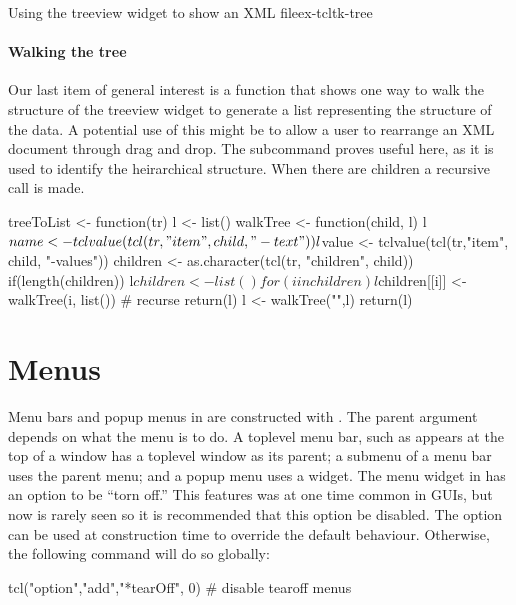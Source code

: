 \begin{example}{Using the treeview widget to show an XML file}{ex-tcltk-tree}
\paragraph{Walking the tree}
Our last item of general interest is a function that shows one way to
walk the structure of the treeview widget to generate a list
representing the structure of the data.  A potential use of this might
be to allow a user to rearrange an XML document through drag and drop.
The subcommand  proves useful here,
as it is used to identify the heirarchical structure. When there are children a recursive call is made.



\begin{Schunk}
\begin{Sinput}
 treeToList <- function(tr) {
   l <- list()
   walkTree <- function(child, l) {
     l$name <- tclvalue(tcl(tr,"item", child, "-text"))
     l$value <- tclvalue(tcl(tr,"item", child, "-values"))
     children <- as.character(tcl(tr, "children", child)) 
     if(length(children)) {
       l$children <- list()
       for(i in children) 
         l$children[[i]] <- walkTree(i, list()) # recurse
     }
     return(l)
   }
   l <- walkTree("",l)
   return(l)
 }
\end{Sinput}
\end{Schunk}
\end{example}



\section{Menus}
\label{sec:tcltk:menus}

Menu bars and popup menus in \Tk\/ are constructed with
. The parent argument depends on what the menu is
to do. A toplevel menu bar, such as appears at the top of a window has
a toplevel window as its parent; a submenu of a menu bar uses the
parent menu; and a popup menu uses a widget.  The menu widget in \Tk\/
has an option to be ``torn off.'' This features was at one time common
in GUIs, but now is rarely seen so it is recommended that this option
be disabled. The  option can be used at
construction time to override the default behaviour. Otherwise, the
following command will do so globally:
\begin{Schunk}
\begin{Sinput}
 tcl("option","add","*tearOff", 0)       # disable tearoff menus
\end{Sinput}
\end{Schunk}


